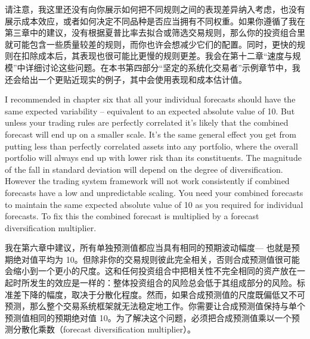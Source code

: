 \begin{chineseblock}请注意，我这里还没有向你展示如何把不同规则之间的表现差异纳入考虑，也没有展示成本效应，或者如何决定不同品种是否应当拥有不同权重。如果你遵循了我在第三章中的建议，没有根据夏普比率去拟合或筛选交易规则，那么你的投资组合里就可能包含一些质量较差的规则，而你也许会想减少它们的配置。同时，更快的规则在扣除成本后，其表现也很可能比更慢的规则更差。我会在第十二章“速度与规模”中详细讨论这些问题。在本书第四部分“坚定的系统化交易者”示例章节中，我还会给出一个更贴近现实的例子，其中会使用表现和成本估计值。\end{chineseblock}


\begin{englishblock} I recommended in chapter six that all your individual forecasts should have the same expected variability -- equivalent to an expected absolute value of 10. But unless your trading rules are perfectly correlated it's likely that the combined forecast will end up on a smaller scale. It's the same general effect you get from putting less than perfectly correlated assets into any portfolio, where the overall portfolio will always end up with lower risk than its constituents. The magnitude of the fall in standard deviation will depend on the degree of diversification. However the trading system framework will not work consistently if combined forecasts have a low and unpredictable scaling. You need your combined forecasts to maintain the same expected absolute value of 10 as you required for individual forecasts. To fix this the combined forecast is multiplied by a forecast diversification multiplier. \end{englishblock}

\begin{chineseblock}我在第六章中建议，所有单独预测值都应当具有相同的预期波动幅度--- 也就是预期绝对值平均为 10。但除非你的交易规则彼此完全相关，否则合成预测值很可能会缩小到一个更小的尺度。这和任何投资组合中把相关性不完全相同的资产放在一起时所发生的效应是一样的：整体投资组合的风险总会低于其组成部分的风险。标准差下降的幅度，取决于分散化程度。然而，如果合成预测值的尺度既偏低又不可预测，那么整个交易系统框架就无法稳定地工作。你需要让合成预测值保持与单个预测值相同的预期绝对值 10。为了解决这个问题，必须把合成预测值乘以一个预测分散化乘数（forecast diversification multiplier）。\end{chineseblock}

\bipairgap

